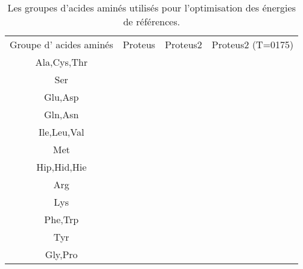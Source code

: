     \begin{table}[!htbp]
      \centering

      \begin{tabular}{cccc}

        \toprule
        Groupe d' acides aminés & Proteus & Proteus2 & Proteus2 (T=0175)\\
        \cmidrule{1-3}

         Ala,Cys,Thr & \\
         Ser         & \\
         Glu,Asp     & \\
         Gln,Asn     & \\
         Ile,Leu,Val & \\
         Met         & \\
         Hip,Hid,Hie & \\
         Arg         & \\
         Lys         & \\
         Phe,Trp     & \\
         Tyr         & \\
         Gly,Pro     & \\
        \bottomrule


      \end{tabular}      
      \caption{Les groupes d'acides aminés utilisés pour l'optimisation des énergies de références.}
\label{tab:RefEner_groupes}      
    \end{table}



    \clearpage


